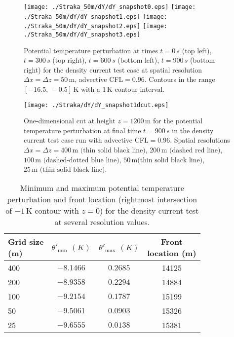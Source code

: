 \documentclass{ametsoc}
\theoremstyle{definition}
\begin{document}
\begin{figure}
\centering
 \texttt{[image: ./Straka\_50m/dY/dY\_snapshot0.eps]}
 \texttt{[image: ./Straka\_50m/dY/dY\_snapshot1.eps]}
 \texttt{[image: ./Straka\_50m/dY/dY\_snapshot2.eps]}
 \texttt{[image: ./Straka\_50m/dY/dY\_snapshot3.eps]}
 \caption{Potential temperature perturbation at times $t=0\, s$ (top left), $t=300\, s$ (top right), $t=600\, s$ (bottom left), $t=900\, s$ (bottom right) for the density current test case at spatial resolution $\Delta x=\Delta z=50\,\textrm{m}$, advective CFL$=0.96$. Contours in the range $[-16.5,\,-0.5]\,\textrm{K}$ with a $1\,\textrm{K}$ contour interval.}
 \label{fig:straka}
\end{figure}

\begin{figure}
\centering
  \texttt{[image: ./Straka/dY/dY\_snapshot1dcut.eps]}
 \caption{One-dimensional cut at height $z=1200\,\textrm{m}$ for the potential temperature perturbation at final time $t=900\, s$ in the density current test case run with advective CFL$=0.96$. Spatial resolutions $\Delta x=\Delta z=400\,\textrm{m (thin solid black line)}$, $200\,\textrm{m (dashed red line)}$, $100\,\textrm{m (dashed-dotted blue line)}$, $50\,\textrm{m(thin solid black line)}$, $25\,\textrm{m (thin solid black line)}$.}
 \label{fig:straka1dcut}
\end{figure}


\begin{table}
\small
\begin{centering}
\begin{tabular}{lccc}
\toprule 
\shortstack{Grid size \\ (m)}& \shortstack{$\theta'_\textrm{min}$ \\ $(K)$} & \shortstack{$\theta'_\textrm{max}$ \\ $(K)$} & \shortstack{Front\\ location (m)} \tabularnewline
\midrule 
400 &  $-8.1466$ & $ 0.2685$ & 14125\tabularnewline
200 &  $-8.9358$ & $0.2294$ & 14884\tabularnewline
100 &  $-9.2154$ & $0.1787$ & 15199\tabularnewline
50 &  $-9.5061$ & $0.0903$ & 15326\tabularnewline
25 &  $-9.6555$ & $0.0138$ & 15381\tabularnewline
\bottomrule 
\end{tabular}

\par\end{centering}
\caption{Minimum and maximum potential temperature perturbation and front location
(rightmost intersection of $-1\,\textrm{K}$ contour with $z=0$) for the density current test at several resolution values.}%
\label{tab:straka_minmax}
\end{table}
\end{document}
